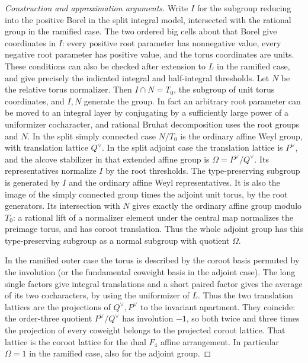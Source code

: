 \documentclass[11pt,a4paper,openany,oneside]{book}
\theoremstyle{resultstyle}
\theoremstyle{definition}
\numberwithin{equation}{chapter}
\begin{document}
\begin{proof}[Construction and approximation arguments]
Write \(I\) for the subgroup reducing into the positive Borel
in the split integral model, intersected with the rational group
in the ramified case. The two ordered big cells about that Borel
give coordinates in \(I\): every positive root parameter has
nonnegative value, every negative root parameter has positive
value, and the torus coordinates are units. These conditions can
also be checked after extension to \(L\) in the ramified case,
and give precisely the indicated integral and half-integral
thresholds. Let \(N\) be the relative torus normalizer. Then
\(I\cap N=T_0\), the subgroup of unit torus coordinates, and
\(I,N\) generate the group. In fact an arbitrary root parameter
can be moved to an integral layer by conjugating by a sufficiently
large power of a uniformizer cocharacter, and rational Bruhat
decomposition uses the root groups and \(N\).
In the split simply connected case \(N/T_0\) is the ordinary affine
Weyl group, with translation lattice \(Q^\vee\). In the split
adjoint case the translation lattice is \(P^\vee\), and the alcove
stabilizer in that extended affine group is
\(\Omega=P^\vee/Q^\vee\). Its representatives normalize \(I\)
by the root thresholds. The type-preserving subgroup is generated
by \(I\) and the ordinary affine Weyl representatives. It is also
the image of the simply connected group times the adjoint unit
torus, by the root generators. Its intersection with \(N\) gives
exactly the ordinary affine group modulo \(T_0\): a rational lift
of a normalizer element under the central map normalizes the
preimage torus, and has coroot translation. Thus the whole
adjoint group has this type-preserving subgroup as a normal
subgroup with quotient \(\Omega\).

In the ramified outer case the torus is described by the
coroot basis permuted by the involution (or the fundamental
coweight basis in the adjoint case). The long single factors give
integral translations and a short paired factor gives the
average of its two cocharacters, by using the uniformizer of
\(L\). Thus the two translation lattices are the projections
of \(Q^\vee,P^\vee\) to the invariant apartment. They coincide:
the order-three quotient \(P^\vee/Q^\vee\) has involution \(-1\),
so both twice and three times the projection of every
coweight belongs to the projected coroot lattice. That lattice
is the coroot lattice for the dual \(F_4\) affine arrangement.
In particular \(\Omega=1\) in the ramified case, also for the
adjoint group.


\end{proof}
\end{document}
